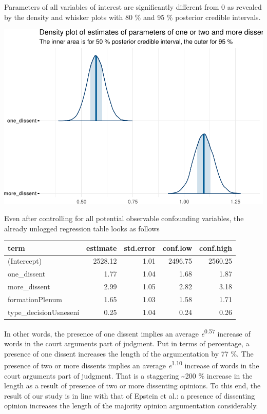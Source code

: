 \documentclass[
  11pt,
]{article}
\begin{document}
Parameters of all variables of interest are significantly different from
0 as revealed by the density and whisker plots with 80 \% and 95 \%
posterior credible intervals.

\includegraphics{dissents_article_files/figure-latex/length_parameter_plots-1.pdf}

Even after controlling for all potential observable confounding
variables, the already unlogged regression table looks as follows

\begin{longtable}[]{@{}lrrrr@{}}
\toprule\noalign{}
term & estimate & std.error & conf.low & conf.high \\
\midrule\noalign{}
\endhead
\bottomrule\noalign{}
\endlastfoot
(Intercept) & 2528.12 & 1.01 & 2496.75 & 2560.25 \\
one\_dissent & 1.77 & 1.04 & 1.68 & 1.87 \\
more\_dissent & 2.99 & 1.05 & 2.82 & 3.18 \\
formationPlenum & 1.65 & 1.03 & 1.58 & 1.71 \\
type\_decisionUsnesení & 0.25 & 1.04 & 0.24 & 0.26 \\
\end{longtable}

In other words, the presence of one dissent implies an average
\emph{e}\textsuperscript{0.57} increase of words in the court arguments
part of judgment. Put in terms of percentage, a presence of one dissent
increases the length of the argumentation by 77 \%. The presence of two
or more dissents implies an average \emph{e}\textsuperscript{1.10}
increase of words in the court arguments part of judgment. That is a
staggering \textasciitilde200 \% increase in the length as a result of
presence of two or more dissenting opinions. To this end, the result of
our study is in line with that of Epstein et al.: a presence of
dissenting opinion increases the length of the majority opinion
argumentation considerably.
\end{document}

